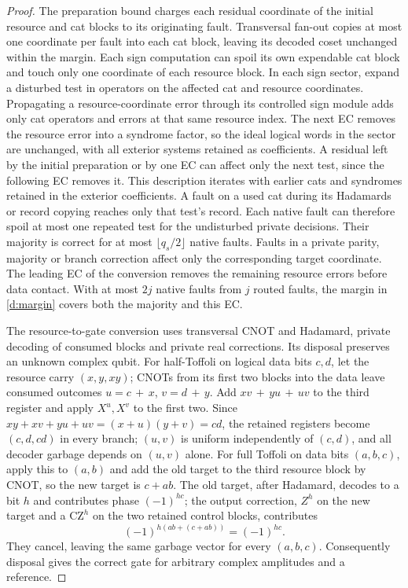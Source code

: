 \begin{proof}
The preparation bound charges each residual coordinate of the initial
resource and cat blocks to its originating fault. Transversal fan-out
copies at most one coordinate per fault into each cat block, leaving
its decoded coset unchanged within the margin. Each sign computation
can spoil its own expendable cat block and touch only one coordinate
of each resource block. In each sign sector, expand a disturbed test
in operators on the affected cat and resource coordinates. Propagating
a resource-coordinate error through its controlled sign module adds
only cat operators and errors at that same resource index. The next
EC removes the resource error into a syndrome factor, so the ideal
logical words in the sector are unchanged, with all exterior systems
retained as coefficients. A residual left by the initial preparation
or by one EC can affect only the next test, since the following EC
removes it. This description iterates with earlier cats and syndromes
retained in the exterior coefficients. A fault on a used cat during
its Hadamards or record copying reaches only that test's record.
Each native fault can therefore spoil at most one repeated test for
the undisturbed private decisions. Their majority is correct for at
most \(\lfloor q_s/2\rfloor\) native faults. Faults in a private parity,
majority or branch correction affect only the corresponding target
coordinate. The leading EC of the conversion removes the remaining
resource errors before data contact. With at most \(2j\) native
faults from \(j\) routed faults, the margin in \eqref{d:margin}
covers both the majority and this EC.

The resource-to-gate conversion uses transversal CNOT and Hadamard,
private decoding of consumed blocks and private real corrections.
Its disposal preserves an unknown complex qubit. For half-Toffoli on
logical data bits \(c,d\), let the resource carry \((x,y,xy)\); CNOTs
from its first two blocks into the data leave consumed outcomes
\(u=c\,+\,x\), \(v=d\,+\,y\). Add
\(xv\,+\,yu\,+\,uv\) to the third register and apply \(X^u,X^v\) to
the first two. Since \(xy+xv+yu+uv=(x+u)(y+v)=cd\), the
retained registers become \((c,d,cd)\) in every branch;
\((u,v)\) is uniform independently of \((c,d)\), and all decoder
garbage depends on \((u,v)\) alone. For full Toffoli on data bits
\((a,b,c)\), apply this to \((a,b)\) and add the old target to the
third resource block by CNOT, so the new target is \(c+ab\). The old
target, after Hadamard, decodes to a bit \(h\) and contributes phase
\((-1)^{hc}\); the output correction, \(Z^h\) on the new target and a
\(\mathrm{CZ}^h\) on the two retained control blocks, contributes
\[
 (-1)^{h(ab+(c+ab))}=(-1)^{hc}.
\]
They cancel, leaving the same garbage vector for every \((a,b,c)\).
Consequently disposal gives the correct gate for arbitrary complex
amplitudes and a reference.


\end{proof}
